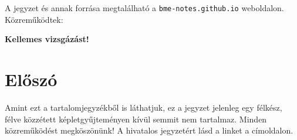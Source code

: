 



\szerzo{}



\begin{titlepage}
		\centering
		\vspace{5cm}\par
		\maketitle
		\large A jegyzet és annak forrása megtalálható a \texttt{bme-notes.github.io} weboldalon.
		\vfill
		Közreműködtek: \the\segitettek
		\normalsize
\end{titlepage}


\noindent \textbf{Kellemes vizsgázást!}

\tableofcontents{}

\section{Előszó}
Amint ezt a tartalomjegyzékből is láthatjuk, ez a jegyzet jelenleg egy félkész, félve közzétett képletgyűjteményen kívül semmit nem tartalmaz. Minden közreműködést megköszönünk! A hivatalos jegyzetért lásd a linket a címoldalon.



